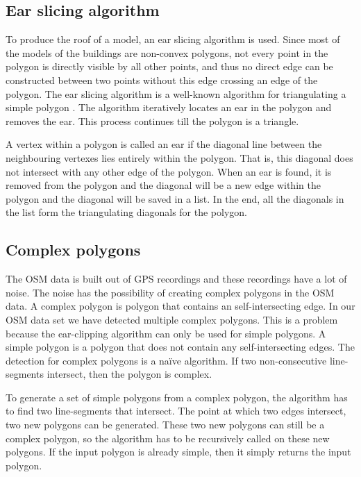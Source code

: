 \subsection{Ear slicing algorithm}
\label{subsec:EarSlicingAlgorithm}
To produce the roof of a model, an ear slicing algorithm is used. Since most of the models of the buildings are non-convex polygons, not every point in the polygon is directly visible by all other points, and thus no direct edge can be constructed between two points without this edge crossing an edge of the polygon. The ear slicing algorithm is a well-known algorithm for triangulating a simple polygon \cite{Kajak11}. The algorithm iteratively locates an ear in the polygon and removes the ear. This process continues till the polygon is a triangle.

A vertex within a polygon is called an ear if the diagonal line between the neighbouring vertexes lies entirely within the polygon. That is, this diagonal does not intersect with any other edge of the polygon. When an ear is found, it is removed from the polygon and the diagonal will be a new edge within the polygon and the diagonal will be saved in a list. In the end, all the diagonals in the list form the triangulating diagonals for the polygon.

\subsection{Complex polygons}
\label{subsec:ComplexPolygons}
The OSM data is built out of GPS recordings and these recordings have a lot of noise. The noise has the possibility of creating complex polygons in the OSM data. A complex polygon is polygon that contains an self-intersecting edge. In our OSM data set we have detected multiple complex polygons. This is a problem because the ear-clipping algorithm can only be used for simple polygons. A simple polygon is a polygon that does not contain any self-intersecting edges. The detection for complex polygons is a naïve algorithm. If two non-consecutive line-segments intersect, then the polygon is complex.

To generate a set of simple polygons from a complex polygon, the algorithm has to find two line-segments that intersect. The point at which two edges intersect, two new polygons can be generated. These two new polygons can still be a complex polygon, so the algorithm has to be recursively called on these new polygons. If the input polygon is already simple, then it simply returns the input polygon.

